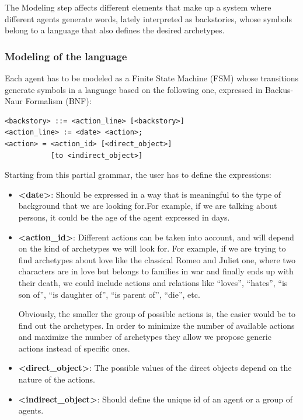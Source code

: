 \documentclass[letterpaper]{article}
\begin{document}
The Modeling step affects different elements that make up a system where different agents generate words, lately interpreted as backstories, whose symbols belong to a language that also defines the desired archetypes.


\subsubsection{Modeling of the language}

Each agent has to be modeled as a Finite State Machine (FSM) whose transitions generate symbols in a language based on the following one, expressed in Backus-Naur Formalism (BNF):

\begin{verbatim}
<backstory> ::= <action_line> [<backstory>]
<action_line> := <date> <action>;
<action> = <action_id> [<direct_object>]
           [to <indirect_object>]
\end{verbatim}

Starting from this partial grammar, the user has to define the expressions:
\begin{itemize}
\item \textbf{<date>}: Should be expressed in a way that is meaningful to the type of background that we are looking for.For example, if we are talking about persons, it could be the age of the agent expressed in days.

\item \textbf{<action\_id>}: Different actions can be taken into account, and will depend on the kind of archetypes we will look for. For example, if we are trying to find archetypes about love like the classical Romeo and Juliet one, where two characters are in love but belongs to families in war and finally ends up with their death, we could include actions and relations like ``loves'', ``hates'', ``is son of'', ``is daughter of'', ``is parent of'', ``die'', etc.

Obviously, the smaller the group of possible actions is, the easier would be to find out the archetypes. In order to minimize the number of available actions and maximize the number of archetypes they allow we propose generic actions instead of specific ones.

\item \textbf{<direct\_object>}: The possible values of the direct objects depend on the nature of the actions.

\item \textbf{<indirect\_object>}: Should define the unique id of an agent or a group of agents.

\end{itemize}
\end{document}
